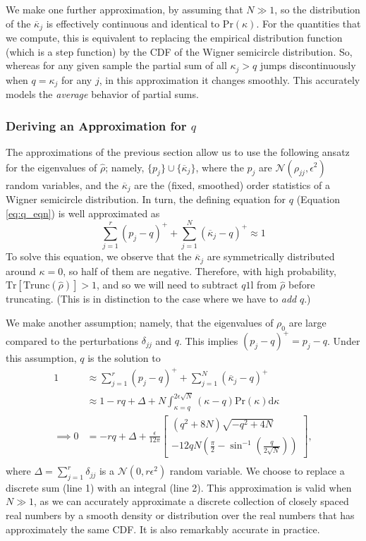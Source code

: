 \documentclass[aps,pra, twocolumn]{revtex4-1}
\newcommand{\Tr}{\mathrm{Tr}}
\newcommand{\Id}{\mathbb{I}}
\def\Id{1\!\mathrm{l}}
\begin{document}
We make one further approximation, by assuming that $N\gg1$, so the distribution of the $\overline{\kappa}_j$ is effectively continuous and identical to $\mathrm{Pr}(\kappa)$. For the quantities that we compute, this is equivalent to replacing the empirical distribution function (which is a step function) by the CDF of the Wigner semicircle distribution.  So, whereas for any given sample the partial sum of all $\kappa_j > q$ jumps discontinuously when $q=\kappa_j$ for any $j$, in this approximation it changes smoothly.  This accurately models the \emph{average} behavior of partial sums.

\subsubsection{Deriving an Approximation for $q$}
The approximations of the previous section allow us to use the following ansatz for the eigenvalues of $\hat\rho$; namely, $\{p_j\} \cup \{\overline{\kappa}_j\}$, where the $p_j$ are $\mathcal{N}(\rho_{jj},\epsilon^2)$ random variables, and the $\overline{\kappa}_j$ are the (fixed, smoothed) order statistics of a Wigner semicircle distribution.  In turn, the defining equation for $q$ (Equation \eqref{eq:q_eqn}) is well approximated as
\begin{equation}
\sum_{j=1}^{r}(p_j - q)^{+} + \sum_{j=1}^{N}{(\overline{\kappa}_j-q)^+} \approx 1
\end{equation}
To solve this equation, we observe that the $\overline{\kappa}_j$ are symmetrically distributed around $
\kappa=0$, so half of them are negative.  Therefore, with high probability, $\Tr
\left[\mathrm{Trunc}(\hat\rho)\right]>1$, and so we will need to subtract $q\Id$ from $\hat\rho$ before truncating. (This is in distinction to the case where we have to \emph{add} $q$.)

We make another assumption; namely, that the eigenvalues of $\rho_{0}$ are large compared to the perturbations $\delta_{jj}$ and $q$. This implies $(p_{j} - q)^{+} = p_{j} - q$. Under this assumption, $q$ is the solution to
\begin{align}
\nonumber 1 &\approx \sum_{j=1}^{r}(p_j - q)^{+} + \sum_{j=1}^{N}{(\overline{\kappa}_j-q)^+}\\
\nonumber &\approx 1 - rq + \Delta + N\int_{\kappa=q}^{2\epsilon\sqrt{N}}{(\kappa-q)\mathrm{Pr}(\kappa)\mathrm{d}\kappa}\\
\label{eq:q_eqn2}\implies 0 &= - rq + \Delta + \frac{\epsilon}{12\pi}\left[
\begin{array}{l} (q^2+8N)\sqrt{-q^2+4N} \\
-12qN\left(\frac{\pi}{2}-\sin^{-1}\left(\frac{q}{2\sqrt{N}}\right)\right)
\end{array}\right],\nonumber\\
~
\end{align}
where $\Delta = \sum_{j=1}^{r}\delta_{jj}$ is a $\mathcal{N}(0,r\epsilon^2)$ random variable.  We choose to replace a discrete 
sum (line 1) with an integral (line 2). This approximation is valid when $N\gg1$, as we can accurately approximate a discrete collection of closely spaced real numbers by a smooth density or distribution over the real numbers that has approximately the same CDF.  It is also remarkably accurate in practice.
  
\end{document}
